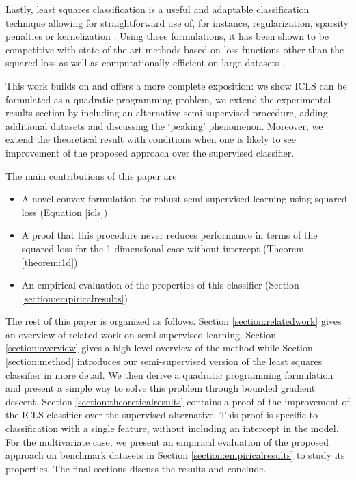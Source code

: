 \documentclass{elsarticle}
\begin{document}
Lastly, least squares classification is a useful and adaptable classification technique  allowing for straightforward use of, for instance, regularization, sparsity penalties or kernelization \cite{Hastie2001,Poggio2003,Rifkin2003,Suykens1999,Tibshirani1996}. 
Using these formulations, it has been shown to be competitive with state-of-the-art methods based on loss functions other than the squared loss \cite{Rifkin2003} as well as computationally efficient on large datasets \cite{Bottou2010}.

This work builds on \cite{Krijthe2015} and offers a more complete exposition: we show ICLS can be formulated  as a quadratic programming problem, we extend the experimental results section by including an alternative semi-supervised procedure, adding additional datasets and discussing the ‘peaking’ phenomenon. Moreover, we extend the theoretical result with conditions when one is likely to see improvement of the proposed approach over the supervised classifier.

The main contributions of this paper are
\begin{itemize}
  \item A novel convex formulation for robust semi-supervised learning using squared loss (Equation \ref{icls})
  \item A proof that this procedure never reduces performance in terms of the squared loss for the 1-dimensional case without intercept (Theorem \ref{theorem:1d})
  \item An empirical evaluation of the properties of this classifier (Section \ref{section:empiricalresults})
\end{itemize}

The rest of this paper is organized as follows. 
Section \ref{section:relatedwork} gives an overview of related work on semi-supervised learning. 
Section \ref{section:overview} gives a high level overview of the method while Section \ref{section:method} introduces our semi-supervised version of the least squares classifier in more detail. 
We then derive a quadratic programming formulation and present a simple way to solve this problem through bounded gradient descent. 
Section \ref{section:theoreticalresults} contains a proof of the improvement of the ICLS classifier over the supervised alternative. This proof is specific to classification with a single feature, without including an intercept in the model. For the multivariate case, we present an empirical evaluation of the proposed approach on benchmark datasets in Section \ref{section:empiricalresults} to study its properties. The final sections discuss the results and conclude.
\end{document}
